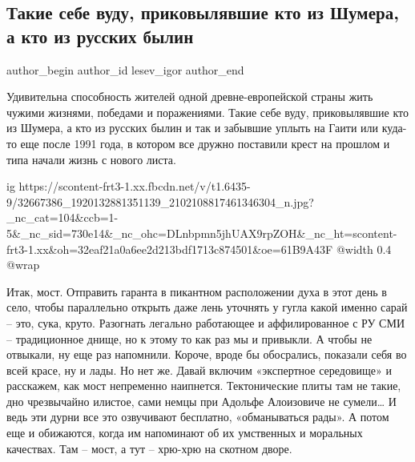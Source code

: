  
 
 
 
 
 
\subsection{Такие себе вуду, приковылявшие кто из Шумера, а кто из русских былин}
\label{sec:15_05_2018.fb.lesev_igor.1.vudu}
 
\ifcmt
 author_begin
   author_id lesev_igor
 author_end
\fi

Удивительна способность жителей одной древне-европейской страны жить чужими
жизнями, победами и поражениями. Такие себе вуду, приковылявшие кто из Шумера,
а кто из русских былин и так и забывшие уплыть на Гаити или куда-то еще после
1991 года, в котором все дружно поставили крест на прошлом и типа начали жизнь
с нового листа.

\ifcmt
  ig https://scontent-frt3-1.xx.fbcdn.net/v/t1.6435-9/32667386_1920132881351139_2102108817461346304_n.jpg?_nc_cat=104&ccb=1-5&_nc_sid=730e14&_nc_ohc=DLnbpmn5jhUAX9rpZOH&_nc_ht=scontent-frt3-1.xx&oh=32eaf21a0a6ee2d213bdf1713c874501&oe=61B9A43F
  @width 0.4
  @wrap 
\fi

Итак, мост. Отправить гаранта в пикантном расположении духа в этот день в село,
чтобы параллельно открыть даже лень уточнять у гугла какой именно сарай – это,
сука, круто. Разогнать легально работающее и аффилированное с РУ СМИ –
традиционное днище, но к этому то как раз мы и привыкли. А чтобы не отвыкали,
ну еще раз напомнили. Короче, вроде бы обосрались, показали себя во всей красе,
ну и лады. Но нет же. Давай включим «экспертное середовище» и расскажем, как
мост непременно наипнется. Тектонические плиты там не такие, дно чрезвычайно
илистое, сами немцы при Адольфе Алоизовиче не сумели… И ведь эти дурни все это
озвучивают бесплатно, «обманываться рады». А потом еще и обижаются, когда им
напоминают об их умственных и моральных качествах. Там – мост, а тут – хрю-хрю
на скотном дворе.


